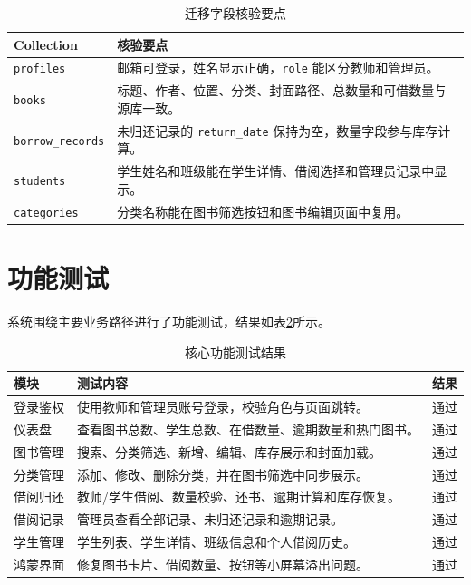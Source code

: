 \begin{table}[htbp]
\centering
\caption{迁移字段核验要点}
\label{tab:migration-field-check}
\begin{tabularx}{0.95\textwidth}{l>{\RaggedRight\arraybackslash}X}
\toprule
\textbf{Collection} & \textbf{核验要点} \\
\midrule
\texttt{profiles} & 邮箱可登录，姓名显示正确，\texttt{role} 能区分教师和管理员。 \\
\texttt{books} & 标题、作者、位置、分类、封面路径、总数量和可借数量与源库一致。 \\
\texttt{borrow\_records} & 未归还记录的 \texttt{return\_date} 保持为空，数量字段参与库存计算。 \\
\texttt{students} & 学生姓名和班级能在学生详情、借阅选择和管理员记录中显示。 \\
\texttt{categories} & 分类名称能在图书筛选按钮和图书编辑页面中复用。 \\
\bottomrule
\end{tabularx}
\end{table}

\section{功能测试}

系统围绕主要业务路径进行了功能测试，结果如表\ref{tab:function-test}所示。

\begin{table}[htbp]
\centering
\caption{核心功能测试结果}
\label{tab:function-test}
\begin{tabularx}{0.95\textwidth}{l>{\RaggedRight\arraybackslash}Xl}
\toprule
\textbf{模块} & \textbf{测试内容} & \textbf{结果} \\
\midrule
登录鉴权 & 使用教师和管理员账号登录，校验角色与页面跳转。 & 通过 \\
仪表盘 & 查看图书总数、学生总数、在借数量、逾期数量和热门图书。 & 通过 \\
图书管理 & 搜索、分类筛选、新增、编辑、库存展示和封面加载。 & 通过 \\
分类管理 & 添加、修改、删除分类，并在图书筛选中同步展示。 & 通过 \\
借阅归还 & 教师/学生借阅、数量校验、还书、逾期计算和库存恢复。 & 通过 \\
借阅记录 & 管理员查看全部记录、未归还记录和逾期记录。 & 通过 \\
学生管理 & 学生列表、学生详情、班级信息和个人借阅历史。 & 通过 \\
鸿蒙界面 & 修复图书卡片、借阅数量、按钮等小屏幕溢出问题。 & 通过 \\
\bottomrule
\end{tabularx}
\end{table}


